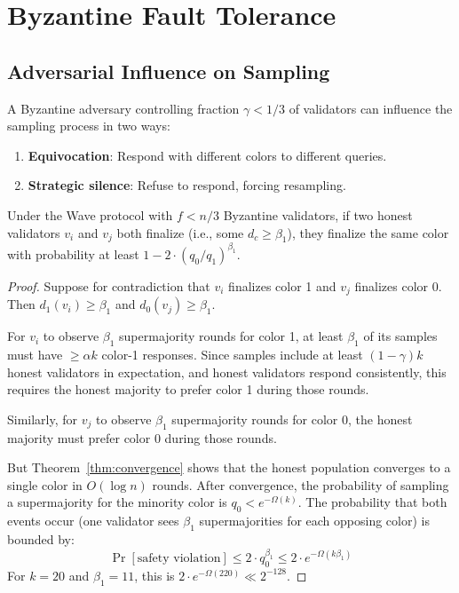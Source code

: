 \section{Byzantine Fault Tolerance}

\label{sec:byzantine}

\subsection{Adversarial Influence on Sampling}

A Byzantine adversary controlling fraction $\gamma < 1/3$ of validators can influence
the sampling process in two ways:
\begin{enumerate}[nosep]
\item \textbf{Equivocation}: Respond with different colors to different queries.
\item \textbf{Strategic silence}: Refuse to respond, forcing resampling.
\end{enumerate}

\begin{theorem}
\label{thm:byz-safety}
Under the Wave protocol with $f < n/3$ Byzantine validators, if two honest validators
$v_i$ and $v_j$ both finalize (i.e., some $d_c \geq \beta_1$), they finalize the same
color with probability at least $1 - 2 \cdot (q_0/q_1)^{\beta_1}$.
\end{theorem}

\begin{proof}
Suppose for contradiction that $v_i$ finalizes color 1 and $v_j$ finalizes color 0.
Then $d_1(v_i) \geq \beta_1$ and $d_0(v_j) \geq \beta_1$.

For $v_i$ to observe $\beta_1$ supermajority rounds for color 1, at least $\beta_1$ of
its samples must have $\geq \alpha k$ color-1 responses. Since samples include at least
$(1-\gamma)k$ honest validators in expectation, and honest validators respond consistently,
this requires the honest majority to prefer color 1 during those rounds.

Similarly, for $v_j$ to observe $\beta_1$ supermajority rounds for color 0, the honest
majority must prefer color 0 during those rounds.

But Theorem~\ref{thm:convergence} shows that the honest population converges to a single
color in $O(\log n)$ rounds. After convergence, the probability of sampling a supermajority
for the minority color is $q_0 < e^{-\Omega(k)}$. The probability that both events occur
(one validator sees $\beta_1$ supermajorities for each opposing color) is bounded by:
\[
\Pr[\text{safety violation}] \leq 2 \cdot q_0^{\beta_1} \leq 2 \cdot e^{-\Omega(k \beta_1)}
\]
For $k = 20$ and $\beta_1 = 11$, this is $2 \cdot e^{-\Omega(220)} \ll 2^{-128}$.
\end{proof}

